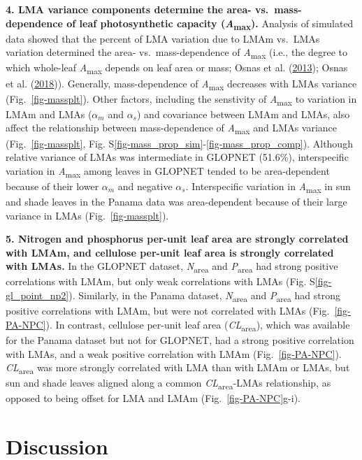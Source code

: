 \documentclass[
  12pt,
  a4paper,
,tablecaptionabove
]{scrartcl}
\begin{document}
\textbf{4. LMA variance components determine the area-
vs.~mass-dependence of leaf photosynthetic capacity
(\emph{A}\textsubscript{max}).} Analysis of simulated data showed that
the percent of LMA variation due to LMAm vs.~LMAs variation determined
the area- vs.~mass-dependence of \emph{A}\textsubscript{max} (i.e., the
degree to which whole-leaf \emph{A}\textsubscript{max} depends on leaf
area or mass; Osnas et al. (\protect\hyperlink{ref-Osnas2013}{2013});
Osnas et al. (\protect\hyperlink{ref-Osnas2018}{2018})). Generally,
mass-dependence of \emph{A}\textsubscript{max} decreases with LMAs
variance (Fig.~\ref{fig-massplt}). Other factors, including the
senstivity of \emph{A}\textsubscript{max} to variation in LMAm and LMAs
(\(\alpha_m\) and \(\alpha_s\)) and covariance between LMAm and LMAs,
also affect the relationship between mass-dependence of
\emph{A}\textsubscript{max} and LMAs variance (Fig.~\ref{fig-massplt},
Fig. S\ref{fig-mass_prop_sim}-\ref{fig-mass_prop_comp}). Although
relative variance of LMAs was intermediate in GLOPNET (51.6\%),
interspecific variation in \emph{A}\textsubscript{max} among leaves in
GLOPNET tended to be area-dependent because of their lower \(\alpha_m\)
and negative \(\alpha_s\). Interspecific variation in
\emph{A}\textsubscript{max} in sun and shade leaves in the Panama data
was area-dependent because of their large variance in LMAs
(Fig.~\ref{fig-massplt}).

\textbf{5. Nitrogen and phosphorus per-unit leaf area are strongly
correlated with LMAm, and cellulose per-unit leaf area is strongly
correlated with LMAs.} In the GLOPNET dataset,
\emph{N}\textsubscript{area} and \emph{P}\textsubscript{area} had strong
positive correlations with LMAm, but only weak correlations with LMAs
(Fig. S\ref{fig-gl_point_np2}). Similarly, in the Panama dataset,
\emph{N}\textsubscript{area} and \emph{P}\textsubscript{area} had strong
positive correlations with LMAm, but were not correlated with LMAs
(Fig.~\ref{fig-PA-NPC}). In contrast, cellulose per-unit leaf area
(\emph{CL}\textsubscript{area}), which was available for the Panama
dataset but not for GLOPNET, had a strong positive correlation with
LMAs, and a weak positive correlation with LMAm (Fig.~\ref{fig-PA-NPC}).
\emph{CL}\textsubscript{area} was more strongly correlated with LMA than
with LMAm or LMAs, but sun and shade leaves aligned along a common
\emph{CL}\textsubscript{area}-LMAs relationship, as opposed to being
offset for LMA and LMAm (Fig.~\ref{fig-PA-NPC}g-i).

\hypertarget{discussion}{%
\section{Discussion}\label{discussion}}
\end{document}
